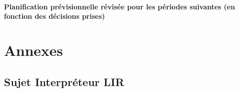 \documentclass[11pt,a4paper,titlepage,openany]{report}
\begin{document}
    \subsection{Planification prévisionnelle révisée pour les périodes suivantes (en fonction des décisions prises)}




    \part{Annexes}

    \appendix
    \chapter{Sujet Interpréteur LIR}

    
    
\end{document}
